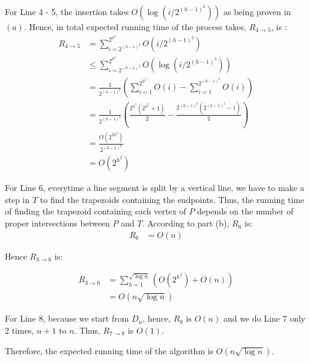 For Line 4 - 5, the insertion takes $O(\log(i/2^{(h-1)^2}))$ as being proven in $(a)$. Hence, in total
expected running time of the process takes, $R_{4\rightarrow5}$, is :
\begin{align*}
R_{4\rightarrow5} &= \sum_{i=2^{(h-1)^2}}^{2^{h^2}}O(i/2^{(h-1)^2}) \\
&\le \sum_{i=2^{(h-1)^2}}^{2^{h^2}}O(\log(i/2^{(h-1)^2})) \\
&= \frac{1}{2^{(h-1)^2}} ( \sum_{i=1}^{2^{h^2}}O(i) - \sum_{i=1}^{2^{(h-1)^2}}O(i) ) \\
&= \frac{1}{2^{(h-1)^2}} ( \frac{2^{h^2}(2^{h^2} + 1)}{2} - \frac{2^{(h-1)^2}(2^{(h-1)^2} - 1)}{2} ) \\
&= \frac{O(2^{2h^2})}{2^{(h-1)^2}} \\
&= O(2^{h^2})
\end{align*}

For Line 6, everytime a line segment is split by a vertical line, we have to make a step in $T$ to find the trapezoids containing the endpoints. Thus, the running time of finding the trapezoid containing each vertex of $P$ depends
on the number of proper intersections between $P$ and $T$. According to part (b), $R_{6}$ is:
\begin{align*}
    R_6 &= O(n)
\end{align*}

Hence $R_{3\rightarrow6}$ is:

\begin{align*}
    R_{3\rightarrow6} &= \sum_{h=1}^{\sqrt{\log{n}}}( O(2^{h^2}) + O(n) ) \\
    &= O(n\sqrt{\log{n}})
\end{align*}

For Line 8, because we start from $D_{n}$, hence, $R_{8}$ is $O(n)$ and we do Line 7 only
2 times, $n+1$ to $n$. Thus, $R_{7\rightarrow8}$ is $O(1)$.

Therefore, the expected running time of the algorithm is $O(n\sqrt{\log{n}})$.
